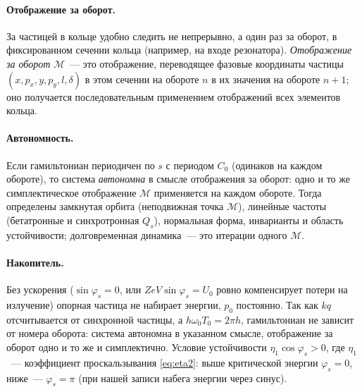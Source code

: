 \documentclass[a4paper,11pt]{article}
\numberwithin{equation}{section}
\begin{document}
\paragraph{Отображение за оборот.} За частицей в кольце удобно следить не непрерывно, а один раз за оборот, в
фиксированном сечении кольца (например, на входе резонатора). \emph{Отображение за оборот} $\mathcal M$~--- это
отображение, переводящее фазовые координаты частицы $(x,p_x,y,p_y,l,\delta)$ в этом сечении на обороте $n$ в их
значения на обороте $n+1$; оно получается последовательным применением отображений всех элементов кольца.

\paragraph{Автономность.} Если гамильтониан периодичен по $s$ с периодом $C_0$ (одинаков на каждом обороте), то
система \emph{автономна} в смысле отображения за оборот: одно и то же симплектическое отображение
$\mathcal M$ применяется на каждом обороте. Тогда определены замкнутая орбита (неподвижная точка $\mathcal M$),
линейные частоты (бетатронные и синхротронная $Q_s$), нормальная форма, инварианты и область устойчивости;
долговременная динамика~--- это итерации одного $\mathcal M$.

\paragraph{Накопитель.} Без ускорения ($\sin\varphi_s=0$, или $ZeV\sin\varphi_s=U_0$ ровно компенсирует потери на
излучение) опорная частица не набирает энергии, $p_0$ постоянно. Так как $kq$ отсчитывается от синхронной
частицы, а $h\omega_0T_0=2\pi h$, гамильтониан не зависит от номера оборота: система автономна в указанном
смысле, отображение за оборот одно и то же и симплектично. Условие устойчивости
$\eta_1\cos\varphi_s>0$, где $\eta_1$~--- коэффициент проскальзывания \eqref{eq:eta2}: выше критической энергии
$\varphi_s=0$, ниже~--- $\varphi_s=\pi$ (при нашей записи набега энергии через синус).
\end{document}
